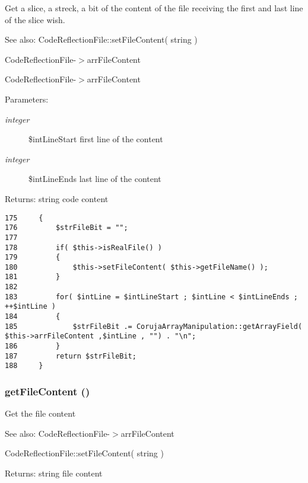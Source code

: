 Get a slice, a streck, a bit of the content of the file receiving the first and last line of the slice wish.

\begin{Desc}
\item[See also:]CodeReflectionFile::setFileContent( string ) 

CodeReflectionFile-$>$arrFileContent 

CodeReflectionFile-$>$arrFileContent \end{Desc}
\begin{Desc}
\item[Parameters:]
\begin{description}
\item[{\em integer}]\$intLineStart first line of the content \item[{\em integer}]\$intLineEnds last line of the content \end{description}
\end{Desc}
\begin{Desc}
\item[Returns:]string code content \end{Desc}


\begin{Code}\begin{verbatim}175     {
176         $strFileBit = "";
177 
178         if( $this->isRealFile() )
179         {
180             $this->setFileContent( $this->getFileName() );
181         }
182 
183         for( $intLine = $intLineStart ; $intLine < $intLineEnds ; ++$intLine )
184         {
185             $strFileBit .= CorujaArrayManipulation::getArrayField( $this->arrFileContent ,$intLine , "") . "\n";
186         }
187         return $strFileBit;
188     }
\end{verbatim}
\end{Code}


\hypertarget{class_code_reflection_file_df23cc1c442ffc832d008858b5c9cc48}{
\subsubsection[{getFileContent}]{\setlength{\rightskip}{0pt plus 5cm}getFileContent ()}}
\label{class_code_reflection_file_df23cc1c442ffc832d008858b5c9cc48}


Get the file content

\begin{Desc}
\item[See also:]CodeReflectionFile-$>$arrFileContent 

CodeReflectionFile::setFileContent( string ) \end{Desc}
\begin{Desc}
\item[Returns:]string file content \end{Desc}


